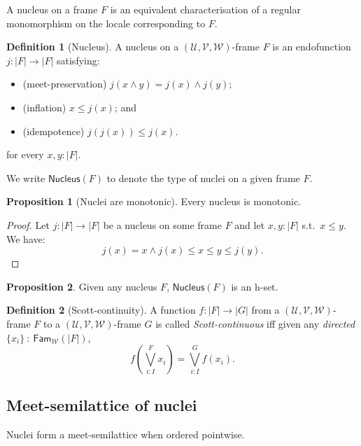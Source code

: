 \documentclass[a4paper, 10pt]{article}
\theoremstyle{definition}
\newtheorem{prop}{Proposition}
\newtheorem{defn}{Definition}
\newcommand{\UU}{\mathcal{U}}
\newcommand{\VV}{\mathcal{V}}
\newcommand{\WW}{\mathcal{W}}
\begin{document}
A nucleus on a frame $F$ is an equivalent characterisation of a regular monomorphism on the locale
corresponding to $F$.

\begin{defn}[Nucleus]
  A nucleus on a $(\UU, \VV, \WW)$-frame $F$ is an endofunction
  $j : | F | \rightarrow | F |$ satisfying:
  \begin{itemize}
    \item (meet-preservation) $j(x \wedge y) = j(x) \wedge j(y)$;
    \item (inflation) $x \le j(x)$; and
    \item (idempotence) $j(j(x)) \le j(x)$.
  \end{itemize}
  for every $x, y : | F |$.
\end{defn}

We write $\mathsf{Nucleus}(F)$ to denote the type of nuclei on a given frame $F$.

\begin{prop}[Nuclei are monotonic]\label{prop:nuclei-mono}
  Every nucleus is monotonic.
\end{prop}
\begin{proof}
  Let $j : | F | \rightarrow | F |$ be a nucleus on some frame $F$ and let $x, y : | F |$ s.t.\ $x \le y$.
  We have:
  \begin{equation*}
    j(x) = x \wedge j(x) \le x \le y \le j(y).
  \end{equation*}
\end{proof}

\begin{prop}
  Given any nucleus $F$, $\mathsf{Nucleus}(F)$ is an h-set.
\end{prop}

\begin{defn}[Scott-continuity]
  A function $f : | F | \rightarrow | G | $ from a $(\UU, \VV, \WW)$-frame $F$ to a $(\UU, \VV, \WW)$-frame
  $G$ is called \emph{Scott-continuous} iff given any \emph{directed}
  $\{ x_i \}~:~\mathsf{Fam}_{\WW}(| F |)$,
  \begin{equation*}
    f\left(\bigvee^F_{i : I} x_i\right) = \bigvee^G_{i : I} f(x_i).
  \end{equation*}
\end{defn}

\subsection{Meet-semilattice of nuclei}

Nuclei form a meet-semilattice when ordered pointwise.
\end{document}

